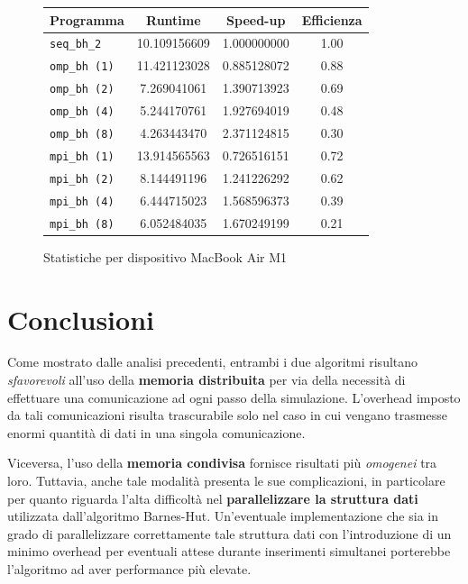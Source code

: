 \documentclass[12pt]{report}
\begin{document}
    \begin{figure}[H]
        \centering

        \begin{tabular}{ l | c | c | c }
            \textbf{Programma} & \textbf{Runtime} & \textbf{Speed-up} & \textbf{Efficienza}\\
            \hline
            \texttt{seq\_bh\_2} & 10.109156609 & 1.000000000 & 1.00 \\
            \hline
            \texttt{omp\_bh (1)} & 11.421123028 & 0.885128072 & 0.88 \\
            \texttt{omp\_bh (2)} & 7.269041061 & 1.390713923 & 0.69 \\
            \texttt{omp\_bh (4)} & 5.244170761 & 1.927694019 & 0.48 \\
            \texttt{omp\_bh (8)} & 4.263443470 & 2.371124815 & 0.30 \\
            \hline
            \texttt{mpi\_bh (1)} & 13.914565563 & 0.726516151 & 0.72 \\
            \texttt{mpi\_bh (2)} & 8.144491196 & 1.241226292 & 0.62 \\
            \texttt{mpi\_bh (4)} & 6.444715023 & 1.568596373 & 0.39 \\
            \texttt{mpi\_bh (8)} & 6.052484035 & 1.670249199 & 0.21 \\
        \end{tabular}
        \caption{Statistiche per dispositivo MacBook Air M1}
        \label{fig:stats_m1_2}
    \end{figure}

    \newpage

    \chapter{Conclusioni}

    Come mostrato dalle analisi precedenti, entrambi i due algoritmi risultano \textit{sfavorevoli} all'uso della \textbf{memoria distribuita} per via della necessità di effettuare una comunicazione ad ogni passo della simulazione. L'overhead imposto da tali comunicazioni risulta trascurabile solo nel caso in cui vengano trasmesse enormi quantità di dati in una singola comunicazione.

    Viceversa, l'uso della \textbf{memoria condivisa} fornisce risultati più \textit{omogenei} tra loro. Tuttavia, anche tale modalità presenta le sue complicazioni, in particolare per quanto riguarda l'alta difficoltà nel \textbf{parallelizzare la struttura dati} utilizzata dall'algoritmo Barnes-Hut. Un'eventuale implementazione che sia in grado di parallelizzare correttamente tale struttura dati con l'introduzione di un minimo overhead per eventuali attese durante inserimenti simultanei porterebbe l'algoritmo ad aver performance più elevate.
\end{document}
